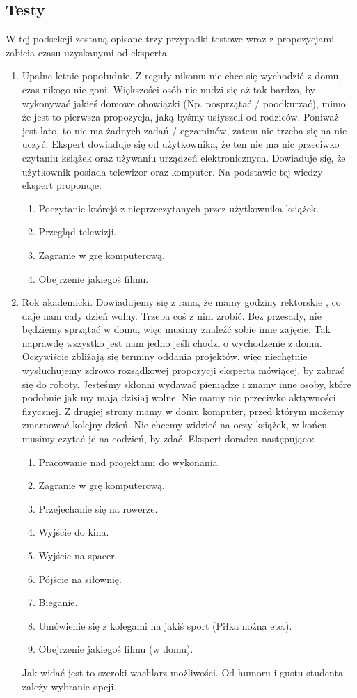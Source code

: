 \documentclass{article}
\begin{document}
\subsection{Testy}
W tej podsekcji zostaną opisane trzy przypadki testowe wraz z propozycjami zabicia czasu uzyskanymi od eksperta.
\begin{enumerate}
	\item Upalne letnie popołudnie. Z reguły nikomu nie chce się wychodzić z domu, czas nikogo nie goni. Większości osób nie nudzi się aż tak bardzo, by wykonywać jakieś domowe obowiązki (Np. posprzątać / poodkurzać), mimo że jest to pierwsza propozycja, jaką byśmy usłyszeli od rodziców. Poniważ jest lato, to nie ma żadnych zadań / egzaminów, zatem nie trzeba się na nie uczyć. Ekspert dowiaduje się od użytkownika, że ten nie ma nic przeciwko czytaniu książek oraz używaniu urządzeń elektronicznych. Dowiaduje się, że użytkownik posiada telewizor oraz komputer. Na podstawie tej wiedzy ekspert proponuje:
	\begin{enumerate}
		\item Poczytanie którejś z nieprzeczytanych przez użytkownika książek.
		\item Przegląd telewizji.
		\item Zagranie w grę komputerową.
		\item Obejrzenie jakiegoś filmu.
	\end{enumerate}

	\item Rok akademicki. Dowiadujemy się z rana, że mamy godziny rektorskie
,
 co daje nam cały dzień wolny. Trzeba coś z nim zrobić. Bez przesady, nie 
 będziemy sprzątać w domu, więc musimy znaleźć sobie inne zajęcie. 
 Tak naprawdę wszystko jest nam jedno jeśli chodzi o wychodzenie z domu. 
 Oczywiście zbliżają się terminy oddania projektów, więc niechętnie wysłuchujemy
	 zdrowo rozsądkowej propozycji eksperta mówiącej, by zabrać się do roboty.
	Jesteśmy skłonni wydawać pieniądze i znamy inne osoby, które podobnie jak my mają dzisiaj wolne. Nie mamy nic przeciwko aktywności fizycznej. Z drugiej strony mamy w domu komputer, przed którym możemy zmarnować kolejny dzień. Nie chcemy widzieć na oczy książek, w końcu musimy czytać je na codzień, by zdać. Ekspert doradza następująco:
	\begin{enumerate}
		\item Pracowanie nad projektami do wykonania.
		\item Zagranie w grę komputerową.
		\item Przejechanie się na rowerze.
		\item Wyjście do kina.
		\item Wyjście na spacer.
		\item Pójście na siłownię.
		\item Bieganie.
		\item Umówienie się z kolegami na jakiś sport (Piłka nożna etc.).
		\item Obejrzenie jakiegoś filmu (w domu).
	\end{enumerate}
	Jak widać jest to szeroki wachlarz możliwości. Od humoru i gustu studenta zależy wybranie opcji. 


\end{enumerate}
\end{document}
